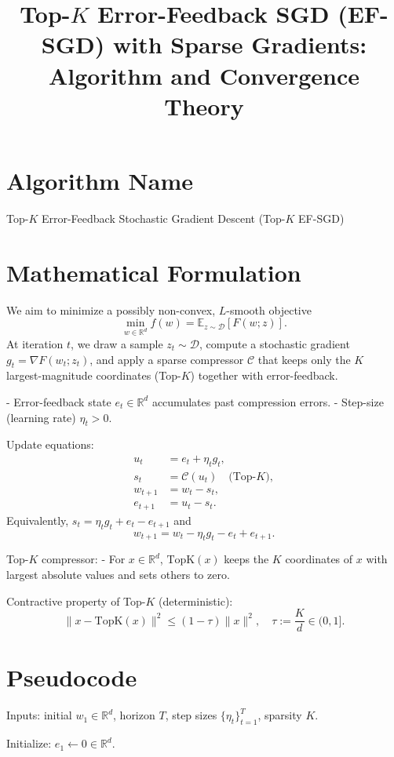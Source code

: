 \documentclass[11pt]{article}
\title{Top-$K$ Error-Feedback SGD (EF-SGD) with Sparse Gradients: Algorithm and Convergence Theory}
\author{}
\date{}
\newcommand{\E}{\mathbb{E}}
\newcommand{\R}{\mathbb{R}}
\begin{document}
\maketitle

\section*{Algorithm Name}
Top-$K$ Error-Feedback Stochastic Gradient Descent (Top-$K$ EF-SGD)

\section*{Mathematical Formulation}
We aim to minimize a possibly non-convex, $L$-smooth objective
\[
\min_{w \in \R^d} f(w) = \E_{z \sim \mathcal{D}}[F(w;z)].
\]
At iteration $t$, we draw a sample $z_t \sim \mathcal{D}$, compute a stochastic gradient $g_t = \nabla F(w_t; z_t)$, and apply a sparse compressor $\mathcal{C}$ that keeps only the $K$ largest-magnitude coordinates (Top-$K$) together with error-feedback.

- Error-feedback state $e_t \in \R^d$ accumulates past compression errors.
- Step-size (learning rate) $\eta_t > 0$.

Update equations:
\[
\begin{aligned}
u_t &= e_t + \eta_t g_t,\\
s_t &= \mathcal{C}(u_t) \quad \text{(Top-$K$)},\\
w_{t+1} &= w_t - s_t,\\
e_{t+1} &= u_t - s_t.
\end{aligned}
\]
Equivalently, $s_t = \eta_t g_t + e_t - e_{t+1}$ and
\[
w_{t+1} = w_t - \eta_t g_t - e_t + e_{t+1}.
\]

Top-$K$ compressor:
- For $x \in \R^d$, $\mathrm{TopK}(x)$ keeps the $K$ coordinates of $x$ with largest absolute values and sets others to zero.

Contractive property of Top-$K$ (deterministic):
\[
\|x - \mathrm{TopK}(x)\|^2 \le (1-\tau)\|x\|^2,\quad \tau := \frac{K}{d} \in (0,1]. 
\]

\section*{Pseudocode}
\noindent
Inputs: initial $w_1 \in \R^d$, horizon $T$, step sizes $\{\eta_t\}_{t=1}^T$, sparsity $K$.

\noindent
Initialize: $e_1 \gets 0 \in \R^d$.
\end{document}

